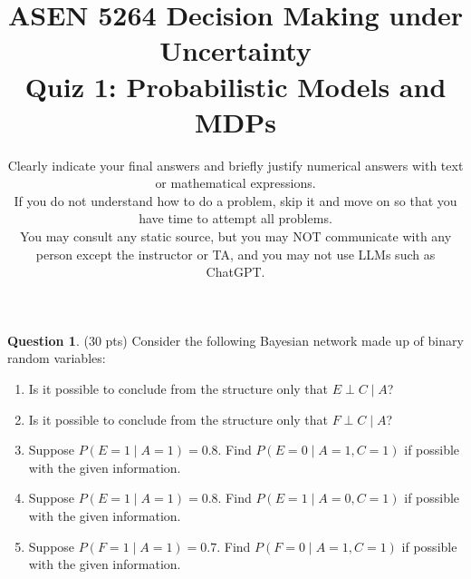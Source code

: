 \documentclass{article}
\title{ASEN 5264 Decision Making under Uncertainty\\
       Quiz 1: Probabilistic Models and MDPs}
\date{\small Clearly indicate your final answers and briefly justify numerical answers with text or mathematical expressions.\\
If you do not understand how to do a problem, skip it and move on so that you have time to attempt all problems.\\
You may consult any static source, but you may NOT communicate with any person except the instructor or TA, and you may not use LLMs such as ChatGPT.}
\theoremstyle{definition}
\newtheorem{question}[thm]{Question}
\begin{document}
\maketitle

\begin{question} (30 pts)
    Consider the following Bayesian network made up of binary random variables:
    \begin{center}
    \end{center}

    \begin{enumerate}[label=\alph*)]
        \item Is it possible to conclude from the structure only that $E \perp C \mid A$?
        \item Is it possible to conclude from the structure only that $F \perp C \mid A$?
        \item Suppose $P(E=1 \mid A=1) = 0.8$. Find $P(E=0 \mid A=1, C=1)$ if possible with the given information.
        \item Suppose $P(E=1 \mid A=1) = 0.8$. Find $P(E=1 \mid A=0, C=1)$ if possible with the given information.
        \item Suppose $P(F=1 \mid A=1) = 0.7$. Find $P(F=0 \mid A=1, C=1)$ if possible with the given information.
    \end{enumerate}
\end{question}

\clearpage
\end{document}
